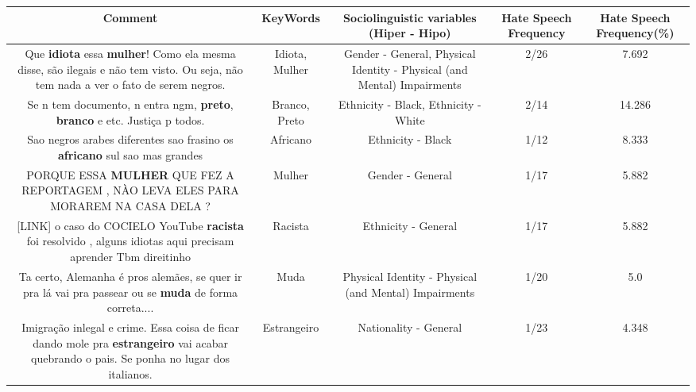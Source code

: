 \documentclass[11pt]{article}
\newlength\mylength
\begin{document}
\begin{center}
\setlength\mylength{\dimexpr\textwidth - 1\arrayrulewidth - 50\tabcolsep}
\begin{longtable}{|C{.65\mylength}|C{.30\mylength}|C{.12\mylength}|C{.12\mylength}|C{.12\mylength}|}
\hline
\textbf{Comment} & \textbf{KeyWords} & \textbf{Sociolinguistic variables (Hiper - Hipo)}  & \textbf{Hate Speech Frequency} & \textbf{Hate Speech Frequency(\%)} \\
\hline{}\small Que \textbf{idiota} essa \textbf{mulher}! Como ela mesma disse, são ilegais e não tem visto. Ou seja, não tem nada a ver o fato de serem negros.\normalsize   & Idiota, Mulher & Gender - General, Physical Identity - Physical (and Mental) Impairments & 2/26 & 7.692 \\  \hline
  \small Se n tem documento, n entra ngm, \textbf{preto}, \textbf{branco} e etc. Justiça p todos.\normalsize   & Branco, Preto & Ethnicity - Black, Ethnicity - White & 2/14 & 14.286 \\  \hline
  \small Sao negros arabes  diferentes sao frasino os  \textbf{africano} sul sao mas grandes\normalsize   & Africano & Ethnicity - Black & 1/12 & 8.333 \\  \hline
  \small PORQUE ESSA \textbf{MULHER} QUE FEZ A REPORTAGEM , NÀO LEVA ELES PARA MORAREM NA CASA DELA ?\normalsize   & Mulher & Gender - General & 1/17 & 5.882 \\  \hline
  \small  [LINK]  o caso do COCIELO YouTube \textbf{racista} foi resolvido , alguns idiotas aqui precisam aprender Tbm direitinho\normalsize   & Racista & Ethnicity - General & 1/17 & 5.882 \\  \hline
  \small Ta certo, Alemanha é pros alemães, se quer ir pra lá vai pra passear ou se \textbf{muda} de forma correta....\normalsize   & Muda & Physical Identity - Physical (and Mental) Impairments & 1/20 & 5.0 \\  \hline
  \small Imigração inlegal e crime. Essa coisa de ficar dando mole pra \textbf{estrangeiro} vai acabar quebrando o pais. Se ponha no lugar dos italianos.\normalsize   & Estrangeiro & Nationality - General & 1/23 & 4.348 \\  \hline

\end{longtable}
\end{center}
\end{document}
